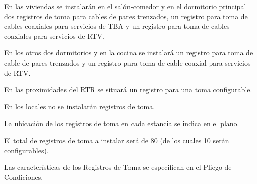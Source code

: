 En las viviendas se instalarán en el salón-comedor y en el dormitorio principal dos registros de toma para cables de pares trenzados, un registro para toma de cables coaxiales para servicios de TBA y un registro para toma de cables coaxiales para servicios de RTV.

En los otros dos dormitorios y en la cocina se instalará un registro para toma de cable de pares trenzados y un registro para toma de cable coaxial para servicios de RTV.

En las proximidades del RTR se situará un registro para una toma configurable.

En los locales no se instalarán registros de toma.

La ubicación de los registros de toma en cada estancia se indica en el plano. 

El total de registros de toma a instalar será de 80 (de los cuales 10 serán configurables).

Las características de los Registros de Toma se especifican en el Pliego de Condiciones.
